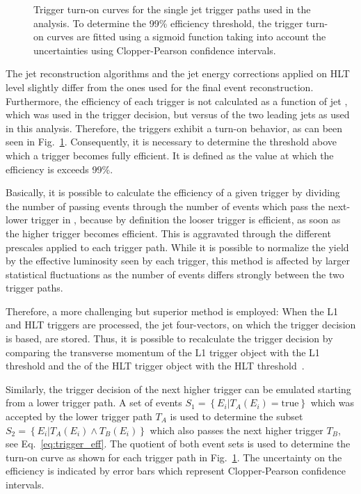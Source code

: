 \begin{figure}[htbp]
    \caption[Turn-on curves of single jet HLT trigger paths]{Trigger turn-on curves for the single jet trigger
    paths used in the analysis. To determine the 99\% efficiency threshold, the
    trigger turn-on curves are fitted using a sigmoid function taking into account the
    uncertainties using Clopper-Pearson confidence intervals.}
    \label{fig:trigger_eff}
\end{figure}

The jet reconstruction algorithms and the jet energy corrections applied on HLT
level slightly differ from the ones used for the final event reconstruction.
Furthermore, the efficiency of each trigger is not calculated as a function of
jet \pt, which was used in the trigger decision, but versus \ptavg of the two
leading jets as used in this analysis. Therefore, the triggers exhibit a turn-on
behavior, as can been seen in Fig.~\ref{fig:trigger_eff}. Consequently, it is
necessary to determine the threshold above which a trigger becomes fully
efficient. It is defined as the value at which the efficiency is exceeds 99\%.

Basically, it is possible to calculate the efficiency of a given trigger by
dividing the number of passing events through the number of events which pass
the next-lower trigger in \pt, because by definition the looser trigger is efficient,
as soon as the higher trigger becomes efficient. This is aggravated through the
different prescales applied to each trigger path. While it is possible to
normalize the yield by the effective luminosity seen by each trigger, this
method is affected by larger statistical fluctuations as the number of events
differs strongly between the two trigger paths.

Therefore, a more challenging but superior method is employed: When the L1
and HLT triggers are processed, the jet four-vectors, on
which the trigger decision is based, are stored. Thus, it is possible to
recalculate the trigger decision by comparing the transverse momentum of the L1
trigger object with the L1 threshold and the \pt of the HLT trigger object with
the HLT threshold~\cite{Stober:2012abc}.

Similarly, the trigger decision of the next higher trigger can be emulated
starting from a lower trigger path. A set of events $S_1 = \left\{E_i | T_A
(E_i) = \mathrm{true} \right\}$ which was accepted  by the lower trigger path $T_A$ is
used to determine the subset $S_2 = \left\{E_i|T_A(E_i) \wedge  T_B(E_i)
\right\}$ which also passes the next higher trigger $T_B$, see
Eq.~\ref{eq:trigger_eff}. The quotient of both event sets is used to determine
the turn-on curve as shown for each trigger path in Fig.~\ref{fig:trigger_eff}. 
The uncertainty on the efficiency is
indicated by error bars which represent Clopper-Pearson confidence intervals.

